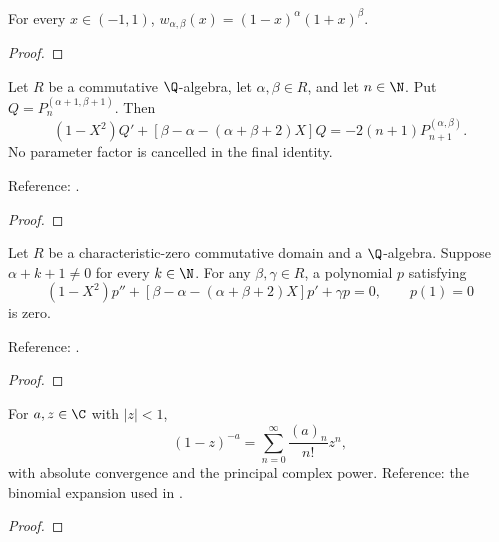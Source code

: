 \begin{supporting}

\begin{theorem}
\label{thm:jacobi-weight-characterisation}
\leanok
For every $x\in(-1,1)$, $w_{\alpha,\beta}(x)=(1-x)^\alpha(1+x)^\beta$.
\end{theorem}
\begin{proof}
\leanok
\end{proof}

\begin{theorem}
\label{thm:jacobi-rodrigues-step}
\leanok
Let $R$ be a commutative $\Q$-algebra, let $\alpha,\beta\in R$, and let $n\in\N$. Put $Q=P_n^{(\alpha+1,\beta+1)}$. Then
\[(1-X^2)Q'+[\beta-\alpha-(\alpha+\beta+2)X]Q
  =-2(n+1)P_{n+1}^{(\alpha,\beta)}.\]
No parameter factor is cancelled in the final identity.

Reference: \cite[18.5.5 and 18.9.16]{dlmf}.
\end{theorem}
\begin{proof}
\leanok
\end{proof}

\begin{theorem}
\label{thm:jacobi-ode-unique}
\leanok
Let $R$ be a characteristic-zero commutative domain and a $\Q$-algebra.
Suppose $\alpha+k+1\ne0$ for every $k\in\N$. For any $\beta,\gamma\in R$,
a polynomial $p$ satisfying
\[(1-X^2)p''+[\beta-\alpha-(\alpha+\beta+2)X]p'+\gamma p=0,\qquad p(1)=0\]
is zero.

Reference: \cite[Table 18.8.1]{dlmf}.
\end{theorem}
\begin{proof}
\leanok
\end{proof}

\begin{theorem}
\label{thm:hypergeometric-binomial}
\leanok
For $a,z\in\C$ with $|z|<1$,
\[
 (1-z)^{-a}=\sum_{n=0}^\infty\frac{(a)_n}{n!}z^n,
\]
with absolute convergence and the principal complex power.
Reference: the binomial expansion used in \cite[15.6.1]{dlmf}.
\end{theorem}
\begin{proof}
\leanok
\end{proof}


\end{supporting}
